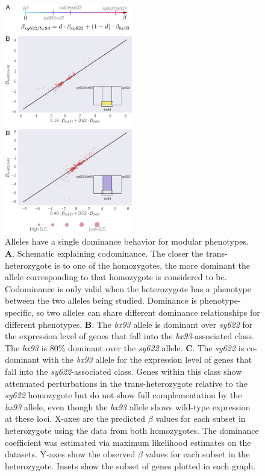 \documentclass[10pt, onecolumn]{article}
\begin{document}
\begin{figure}
  \centering{}
  \includegraphics[width=0.5\textwidth]{../figs/dominance_classes.pdf}
  \caption{
    Alleles have a single dominance behavior for modular phenotypes.
    \textbf{A}. Schematic explaining codominance. The closer the
    trans-heterozygote is to one of the homozygotes, the more dominant the allele
    corresponding to that homozygote is considered to be. Codominance is only
    valid when the heterozygote has a phenotype between the two alleles being
    studied. Dominance is phenotype-specific, so two alleles can share different
    dominance relationships for different phenotypes.
    \textbf{B}.
    The \emph{bx93} allele is dominant over
    \emph{sy622} for the expression level of genes that fall into the
    \emph{bx93}-associated class. The \emph{bx93} is 80\% dominant over the
    \emph{sy622} allele.
    \textbf{C}. The \emph{sy622} is co-dominant with the
    \emph{bx93} allele for the expression level of genes that fall into the
    \emph{sy622}-associated class. Genes within this class show attenuated
    perturbations in the trans-heterozygote relative to the \emph{sy622}
    homozygote but do not show full complementation by the \emph{bx93} allele,
    even though the \emph{bx93} allele shows wild-type expression at these loci.
    X-axes are the predicted $\beta$ values for each subset in heterozygote
    using the data from both homozygotes.
    The dominance coefficient was estimated
    via maximum likelihood estimates on the datasets.
    Y-axes show the observed $\beta$ values for each subset in the heterozygote.
    Insets show the subset of genes plotted in each graph.
    }
\label{fig:transhet}
\end{figure}
\end{document}
